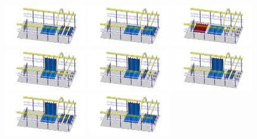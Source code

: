 \begin{figure}[!t]
\includegraphics[width=0.32\textwidth]{./Figures/assembly_sequence_11_07/8.png}
\includegraphics[width=0.32\textwidth]{./Figures/assembly_sequence_11_07/9.png}
\includegraphics[width=0.32\textwidth]{./Figures/assembly_sequence_11_07/10.png}
\includegraphics[width=0.32\textwidth]{./Figures/assembly_sequence_11_07/11.png}
\includegraphics[width=0.32\textwidth]{./Figures/assembly_sequence_11_07/12.png}
\includegraphics[width=0.32\textwidth]{./Figures/assembly_sequence_11_07/13.png}
\includegraphics[width=0.32\textwidth]{./Figures/assembly_sequence_11_07/14.png}
\includegraphics[width=0.32\textwidth]{./Figures/assembly_sequence_11_07/15.png}

\end{figure}
